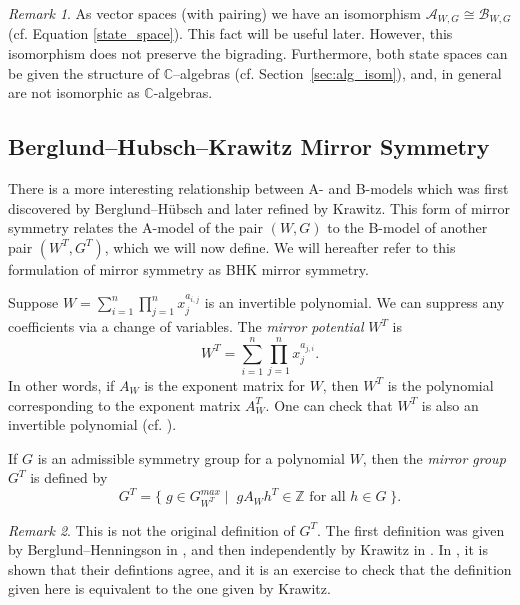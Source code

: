 \documentclass[10pt, letterpaper]{amsart}
\theoremstyle{remark}
\newtheorem{rem}{Remark}[thm]
\newcommand{\CC}{\mathbb C}
\newcommand{\ZZ}{\mathbb{Z}}
\newcommand{\sA}{\mathscr{A}}
\newcommand{\sB}{\mathscr{B}}
\newcommand{\set}[1]{\{#1\}}
\newcommand{\defital}{\textit}
\begin{document}
\begin{rem}\label{r:ABiso}
As vector spaces (with pairing) we have an isomorphism $\sA_{W,G}\cong \sB_{W,G}$ (cf. Equation \ref{state_space}). This fact will be useful later. However, this isomorphism does not preserve the bigrading. Furthermore, both state spaces can be given the structure of $\CC$--algebras (cf. Section~\ref{sec:alg_isom}), and, in general are not isomorphic as $\CC$-algebras. 
\end{rem}



\subsection{Berglund--Hubsch--Krawitz Mirror Symmetry}\label{sec:BHK}
There is a more interesting relationship between A- and B-models which was first discovered by Berglund--H\"ubsch and later refined by Krawitz. This form of mirror symmetry relates the A-model of the pair $(W,G)$ to the B-model of another pair $(W^T, G^T)$, which we will now define. We will hereafter refer to this formulation of mirror symmetry as BHK mirror symmetry.  

Suppose $W=\sum_{i=1}^n  \prod_{j=1}^n x_j^{a_{i,j}}$ is an invertible polynomial. We can suppress any coefficients via a change of variables. The \defital{mirror potential} $W^T$ is 
\[
W^T = \sum_{i=1}^n  \prod_{j=1}^n x_j^{a_{j,i}}. 
\]
In other words, if $A_W$ is the exponent matrix for $W$, then $W^T$ is the polynomial corresponding to the exponent matrix $A_W^T$. One can check that $W^T$ is also an invertible polynomial (cf. \cite{ChR1}). 
 
If $G$ is an admissible symmetry group for a polynomial $W$, then the \defital{mirror group} $G^T$ is defined by 
\[
G^T = \set{\; g \in G_{W^T}^{max} \; | \;\;g A_{W} h^T \in \ZZ \text{ for all } h \in G \; }.
\]
\begin{rem}
This is not the original definition of $G^T$. The first definition was given by Berglund--Henningson in \cite{BHen}, and then independently by Krawitz in \cite{Kr}. In \cite{involutions}, it is shown that their defintions agree, and it is an exercise to check that the definition given here is equivalent to the one given by Krawitz. 
\end{rem}
\end{document}

